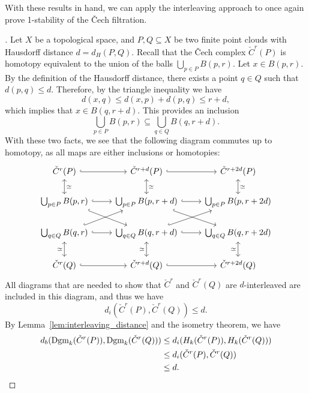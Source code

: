 With these results in hand, we can apply the interleaving approach to once again
prove 1-stability of the \v{C}ech filtration.
\begin{proof}[\cite{schnider2024introduction}]
    Let $X$ be a topological space, and $P, Q \subseteq X$ be two finite
    point clouds with Hausdorff distance $d = d_H(P, Q)$.
    Recall that the \v{C}ech complex $\check{C}^r(P)$ is homotopy equivalent
    to the union of the balls $\bigcup_{p \in P} B(p, r)$.
    Let $x \in B(p, r)$. By the definition of the Hausdorff distance, there exists
    a point $q \in Q$ such that $d(p, q) \leq d$. Therefore, by the triangle
    inequality we have
    \begin{equation}
        d(x, q) \leq d(x, p) + d(p, q) \leq r + d,
    \end{equation}
    which implies that $x \in B(q, r + d)$. This provides an inclusion
    \begin{equation}
        \bigcup_{p \in P} B(p, r) \subseteq \bigcup_{q \in Q} B(q, r + d).
    \end{equation}
    With these two facts, we see that the following diagram commutes up to
    homotopy, as all maps are either inclusions or homotopies:
    \begin{equation}
        \begin{tikzcd}
            \check{C}^r(P) \arrow[hook]{r} \arrow[leftrightarrow]{d}{\simeq}
            & \check{C}^{r + d}(P) \arrow[hook]{r} \arrow[leftrightarrow]{d}{\simeq}
            & \check{C}^{r + 2d}(P) \arrow[leftrightarrow]{d}{\simeq} \\
            \bigcup_{p \in P} B(p, r) \arrow[hook]{r} \arrow[hook]{dr}
            & \bigcup_{p \in P} B(p, r + d) \arrow[hook]{r} \arrow[hook]{dr}
            & \bigcup_{p \in P} B(p, r + 2d) \\
            \bigcup_{q \in Q} B(q, r) \arrow[hook]{r} \arrow[hook]{ur}
            & \bigcup_{q \in Q} B(q, r + d) \arrow[hook]{r} \arrow[hook]{ur}
            & \bigcup_{q \in Q} B(q, r + 2d) \\
            \check{C}^r(Q) \arrow[hook]{r} \arrow[leftrightarrow]{u}{\simeq}
            & \check{C}^{r + d}(Q) \arrow[hook]{r} \arrow[leftrightarrow]{u}{\simeq}
            & \check{C}^{r + 2d}(Q) \arrow[leftrightarrow]{u}{\simeq}
        \end{tikzcd}
    \end{equation}
    All diagrams that are needed to show that $\check{C}^r$ and $\check{C}^r(Q)$ are
    $d$-interleaved are included in this diagram, and thus we have
    \begin{equation}
        d_i(\check{C}^r(P), \check{C}^r(Q)) \leq d.
    \end{equation}
    By Lemma~\ref{lem:interleaving_distance} and the isometry theorem, we have
    \begin{align}
        d_b(\operatorname{Dgm}_k(\check{C}^r(P)), \operatorname{Dgm}_k(\check{C}^r(Q)))
        & \leq d_i(H_k(\check{C}^r(P)), H_k(\check{C}^r(Q))) \\
        & \leq d_i(\check{C}^r(P), \check{C}^r(Q)) \\
        & \leq d.
    \end{align}
\end{proof}
